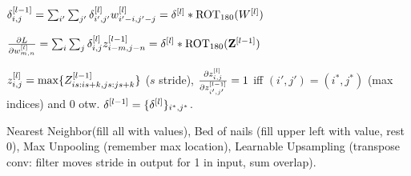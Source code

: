 \begin{definition}[Backprop]
    \(\delta^{[l-1]}_{i, j} = \sum_{i'}\sum_{j'}\delta_{i', j'}^{[l]} w_{i'-i, j'-j}^{[l]} = \delta^{[l]} \ast \text{ROT}_{180}(W^{[l]})\)
\end{definition}

\begin{definition}[Update]
    \(\frac{\partial L}{\partial w_{m, n}^{[l]}} = \sum_i \sum_j \delta_{i, j} ^{[l]} z_{i-m, j-n}^{[l -1]} = \delta^{[l]} \ast \text{ROT}_{180}(\vb{Z}^{[l-1]})\)
\end{definition}

\begin{definition}
    \(z_{i, j}^{[l]} = \max\{Z_{is:is+k, js:js+k}^{[l-1]}\}\) (\(s\) stride), \(\frac{\partial z_{i, j}^{[l]}}{\partial z_{i', j'} ^{[l-1]}} = 1\) iff \((i',j') = (i^*, j^*)\) (max indices) and 0 otw. \(\delta^{[l-1]} = \{\delta^{[l]}\}_{i^*, j^*}\).
\end{definition}

\begin{definition}[Upsampling]
    Nearest Neighbor(fill all with values), Bed of nails (fill upper left with value, rest 0), Max Unpooling (remember max location), Learnable Upsampling (transpose conv: filter moves stride in output for 1 in input, sum overlap).
\end{definition}
